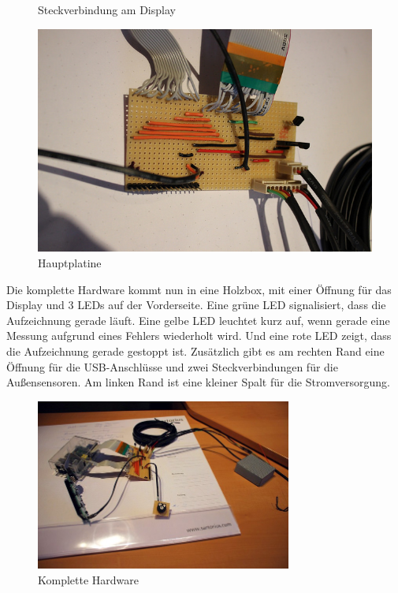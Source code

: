 \begin{figure}[h]
\begin{minipage}[b]{0.45\textwidth}
		\caption{Steckverbindung am Display}
	\end{minipage}\hfill
	\begin{minipage}[b]{0.45\textwidth}
		\centering
		\includegraphics[width=\textwidth]{figures/anschluss/2_4.jpg}
		\caption{Hauptplatine}
	\end{minipage}
\end{figure}

Die komplette Hardware kommt nun in eine Holzbox, mit einer Öffnung für das Display und 3  \glspl{LED} auf der Vorderseite. Eine grüne \gls{LED} signalisiert, dass die Aufzeichnung gerade läuft. Eine gelbe \gls{LED} leuchtet kurz auf, wenn gerade eine Messung aufgrund eines Fehlers wiederholt wird. Und eine rote \gls{LED} zeigt, dass die Aufzeichnung gerade gestoppt ist. Zusätzlich gibt es am rechten Rand eine Öffnung für die USB-Anschlüsse und zwei Steckverbindungen für die Außensensoren. Am linken Rand ist eine kleiner Spalt für die Stromversorgung.

\begin{figure}[h]
	\centering
	\includegraphics[width=0.75\textwidth]{figures/anschluss/2_5.jpg}
	\caption{Komplette Hardware}
\end{figure}	

